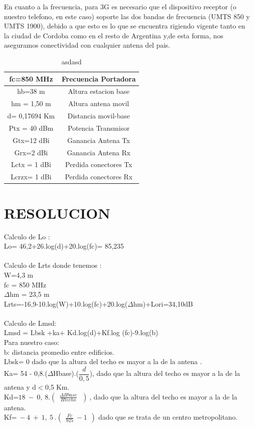 \documentclass[conference, 9pt, a4paper]{IEEEtran}
\begin{document}
En cuanto a la frecuencia, para 3G es necesario que el
dispositivo receptor (o nuestro telefono, en este caso) soporte las dos bandas de frecuencia (UMTS 850 y UMTS 1900), debido a que esto es lo que se encuentra rigiendo vigente tanto en la ciudad de Cordoba como en el resto de Argentina y,de esta forma, nos aseguramos conectividad con cualquier antena del pais.


\begin{table}
\centering
\begin{tabular}{|c|c|}\hline  
	fc=850 MHz					  & Frecuencia Portadora \\ \hline 
	hb=38 m						   & Altura estacion base \\ \hline 
	hm = 1,50 m			          & Altura antena movil \\ \hline
	d= 0,17694 Km 				& Distancia movil-base \\ \hline
	Ptx = 40 dBm				& Potencia Transmisor \\ \hline
	Gtx=12 dBi					 & Ganancia Antena Tx \\ \hline 
	Grx=2 dBi					& Ganancia Antena Rx \\ \hline 
	Lctx = 1 dBi				& Perdida conectores Tx \\ \hline
	Lcrzx= 1 dBi 				& Perdida conectores Rx \\ \hline

\end{tabular}
\caption{asdasd}
\end{table}







\section{RESOLUCION}
Calculo de Lo :\\
Lo= 46,2+26.log(d)+20.log(fc)= 85,235\\\\
Calculo de Lrts donde tenemos :\\
W=4,3 m\\
fc = 850 MHz\\
$\Delta $hm = 23,5 m\\
Lrts=-16,9-10.log(W)+10.log(fc)+20.log($\Delta$hm)+Lori=34,10dB\\
\\
Calculo de Lmsd:\\
Lmsd = Lbsk +ka+ Kd.log(d)+Kf.log (fc)-9.log(b)\\
Para nuestro caso:\\
b:  distancia promedio entre edificios.\\
Lbsk= 0 dado que la altura del techo es mayor a la de la antena .\\
Ka= 54 - 0,8.($\Delta$Hbase).($\dfrac{d}{0,5}$), dado que la altura del techo es  mayor a la de la antena y d$<$0,5 Km.\\
Kd=$ 18\ -\ 0,\ 8.\left( \ \ \frac{\Delta Hbase}{Htecho} \ \ \ \right)\ $,  dado que la altura del techo es mayor a la de la antena.\\
Kf=$\ -4\ +\ 1,\ 5\ .\left( \ \ \frac{Fc}{925} \ -1\ \ \right)$ dado que se trata de un centro metropolitano.\\
\end{document}
